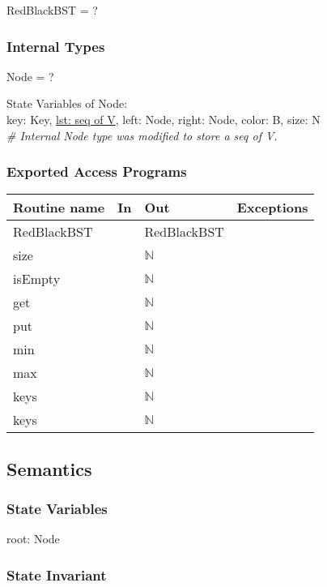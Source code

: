 \documentclass[12pt]{article}
\begin{document}
RedBlackBST = ?

\subsubsection* {Internal Types}

Node = ?

\noindent State Variables of Node:\\
key: Key,
\underline {lst: seq of V},
left: Node,
right: Node,
color: B,
size: N\\

\noindent \textit{\# Internal Node type was modified to store a seq of V.}

\subsubsection* {Exported Access Programs}

\begin{tabular}{| l | l | l | l |}
\hline
\textbf{Routine name} & \textbf{In} & \textbf{Out} & \textbf{Exceptions}\\
\hline
RedBlackBST & ~ & RedBlackBST & \\
\hline
size & ~ & $\mathbb{N}$ & ~\\
\hline
isEmpty & ~ & $\mathbb{N}$ & ~\\
\hline
get & ~ & $\mathbb{N}$ & ~\\
\hline
put & ~ & $\mathbb{N}$ & ~\\
\hline
min & ~ & $\mathbb{N}$ & ~\\
\hline
max & ~ & $\mathbb{N}$ & ~\\
\hline
keys & ~ & $\mathbb{N}$ & ~\\
\hline
keys & ~ & $\mathbb{N}$ & ~\\
\hline
\end{tabular}

\subsection* {Semantics}

\subsubsection* {State Variables}

root: Node

\subsubsection* {State Invariant}
\end{document}

